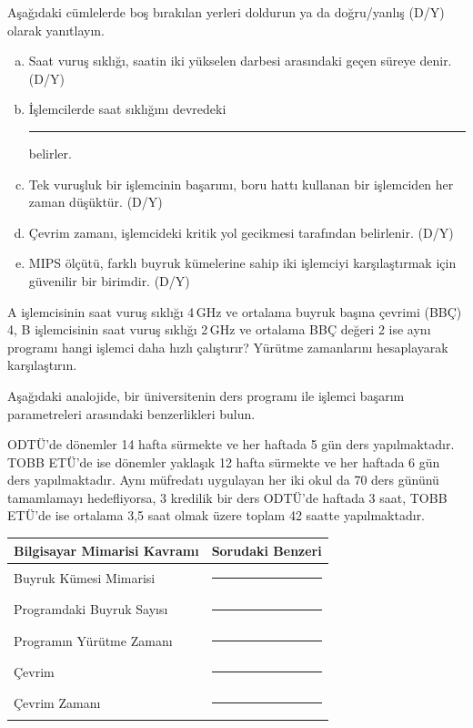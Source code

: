 
\begin{alistirma}[\kolay]
Aşağıdaki cümlelerde boş bırakılan yerleri doldurun ya da doğru/yanlış (D/Y) olarak yanıtlayın.
\begin{enumerate}[(a)]
    \item Saat vuruş sıklığı, saatin iki yükselen darbesi arasındaki geçen süreye denir. (D/Y)
    \item İşlemcilerde saat sıklığını devredeki \rule{3cm}{0.4pt} belirler.
    \item Tek vuruşluk bir işlemcinin başarımı, boru hattı kullanan bir işlemciden her zaman düşüktür. (D/Y)
    \item Çevrim zamanı, işlemcideki kritik yol gecikmesi tarafından belirlenir. (D/Y)
    \item MIPS ölçütü, farklı buyruk kümelerine sahip iki işlemciyi karşılaştırmak için güvenilir bir birimdir. (D/Y)
\end{enumerate}
\end{alistirma}

\begin{alistirma}[\kolay]
A işlemcisinin saat vuruş sıklığı 4\,GHz ve ortalama buyruk başına çevrimi (BBÇ) 4, B işlemcisinin saat vuruş sıklığı 2\,GHz ve ortalama BBÇ değeri 2 ise aynı programı hangi işlemci daha hızlı çalıştırır? Yürütme zamanlarını hesaplayarak karşılaştırın.
\end{alistirma}

\begin{alistirma}[\orta]
Aşağıdaki analojide, bir üniversitenin ders programı ile işlemci başarım parametreleri arasındaki benzerlikleri bulun.

ODTÜ'de dönemler 14 hafta sürmekte ve her haftada 5 gün ders yapılmaktadır. TOBB ETÜ'de ise dönemler yaklaşık 12 hafta sürmekte ve her haftada 6 gün ders yapılmaktadır. Aynı müfredatı uygulayan her iki okul da 70 ders gününü tamamlamayı hedefliyorsa, 3 kredilik bir ders ODTÜ'de haftada 3 saat, TOBB ETÜ'de ise ortalama 3,5 saat olmak üzere toplam 42 saatte yapılmaktadır.

\begin{center}
\begin{tabular}{ll}
\toprule
\textbf{Bilgisayar Mimarisi Kavramı} & \textbf{Sorudaki Benzeri} \\
\midrule
Buyruk Kümesi Mimarisi & \rule{3cm}{0.4pt} \\
Programdaki Buyruk Sayısı & \rule{3cm}{0.4pt} \\
Programın Yürütme Zamanı & \rule{3cm}{0.4pt} \\
Çevrim & \rule{3cm}{0.4pt} \\
Çevrim Zamanı & \rule{3cm}{0.4pt} \\
\bottomrule
\end{tabular}
\end{center}
\end{alistirma}

